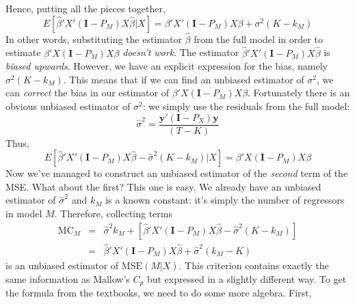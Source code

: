 Hence, putting all the pieces together,
\begin{equation*}
E\left[\widehat{\beta}'X'(\mathbf{I} - P_M)X\widehat{\beta} |X\right] = \beta'X'(\mathbf{I}- P_M)X\beta +  \sigma^2 (K - k_M) 
\end{equation*}
In other words, substituting the estimator $\widehat{\beta}$ from the full model in order to estimate $\beta'X(\mathbf{I}- P_M)X\beta$ \emph{doesn't work}. 
The estimator $\widehat{\beta}'X'(\mathbf{I} - P_M)X\widehat{\beta}$ is \emph{biased upwards}.
However, we have an explicit expression for the bias, namely $\sigma^2 (K - k_M)$.
This means that if we can find an unbiased estimator of $\sigma^2$, we can \emph{correct} the bias in our estimator of $\beta'X(\mathbf{I}- P_M)X\beta$.
Fortunately there is an obvious unbiased estimator of $\sigma^2$: we simply use the residuals from the full model:
	$$\widehat{\sigma}^2 = \frac{\mathbf{y}'(\mathbf{I} - P_X)\mathbf{y}}{(T-K)}$$
Thus, 
	$$E[\widehat{\beta}'X'(\mathbf{I} - P_M)X\widehat{\beta} - \widehat{\sigma}^2(K- k_M) |X ] = \beta'X(\mathbf{I}- P_M)X\beta$$ 
Now we've managed to construct an unbiased estimator of the \emph{second} term of the MSE.
What about the first? This one is easy.
We already have an unbiased estimator of $\widehat{\sigma}^2$ and $k_M$ is a known constant: it's simply the number of regressors in model $M$.
Therefore, collecting terms
	\begin{eqnarray*}
		\mbox{MC}_M &=& \widehat{\sigma}^2 k_M + \left[\widehat{\beta}'X'(\mathbf{I} - P_M)X\widehat{\beta} - \widehat{\sigma}^2(K- k_M) \right]\\
			&=& \widehat{\beta}'X'(\mathbf{I} - P_M)X\widehat{\beta} + \widehat{\sigma}^2 (k_M - K)
	\end{eqnarray*}
is an unbiased estimator of $\mbox{MSE}(M|X)$. This criterion contains exactly the same information as Mallow's $C_p$ but expressed in a slightly different way. To get the formula from the textbooks, we need to do some more algebra. First, 
